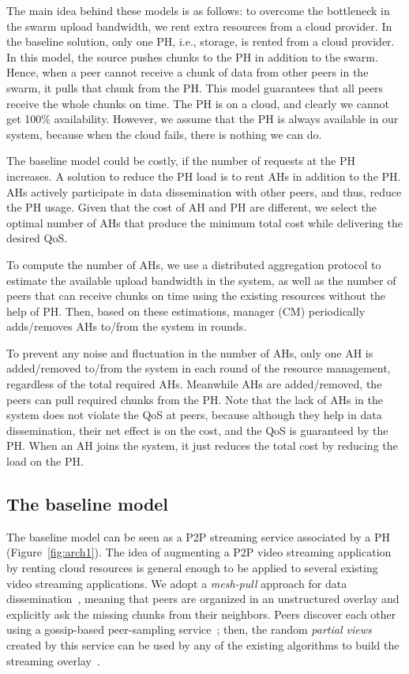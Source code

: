 The main idea behind these models is as follows: to overcome the bottleneck in the swarm upload bandwidth, we rent extra resources from a cloud provider. In the baseline solution, only one PH, i.e., storage, is rented from a cloud provider. In this model, the source pushes chunks to the PH in addition to the swarm. Hence, when a peer cannot receive a chunk of data from other peers in the swarm, it pulls that chunk from the PH. This model guarantees that all peers receive the whole chunks on time. The PH is on a cloud, and clearly we cannot get 100\% availability. However, we assume that the PH is always available in our system, because when the cloud fails, there is nothing we can do.

The baseline model could be costly, if the number of requests at the PH increases. A solution to reduce the PH load is to rent AHs in addition to the PH. AHs actively participate in data dissemination with other peers, and thus, reduce the PH usage. Given that the cost of AH and PH are different, we select the optimal number of AHs that produce the minimum total cost while delivering the desired QoS. 

To compute the number of AHs, we use a distributed aggregation protocol to estimate the available upload bandwidth in the system, as well as the number of peers that can receive chunks on time using the existing resources without the help of PH. Then, based on these estimations, \clive manager (CM) periodically adds/removes AHs to/from the system in rounds.

To prevent any noise and fluctuation in the number of AHs, only one AH is added/removed to/from the system in each round of the resource management, regardless of the total required AHs. Meanwhile AHs are added/removed, the peers can pull required chunks from the PH. Note that the lack of AHs in the system does not violate the QoS at peers, because although they help in data dissemination, their net effect is on the cost, and the QoS is guaranteed by the PH. When an AH joins the system, it just reduces the total cost by reducing the load on the PH.

\subsection{The baseline model}
The baseline model can be seen as a P2P streaming service associated by a
PH (Figure~\ref{fig:arch1}). The idea of augmenting a P2P video streaming application by renting
cloud resources is general enough to be applied to several existing video
streaming applications. We adopt a {\em mesh-pull} approach for data
dissemination~\cite{challenge}, meaning that peers are organized in an
unstructured overlay and explicitly ask the missing chunks from their
neighbors. Peers discover each other using a gossip-based peer-sampling
service~\cite{croupier,gozar,cyclon}; then, the random \emph{partial
views} created by this service can be used by any of the existing algorithms
to build the streaming overlay~\cite{qoe,glive,newcoolstreaming,chainsaw}.

